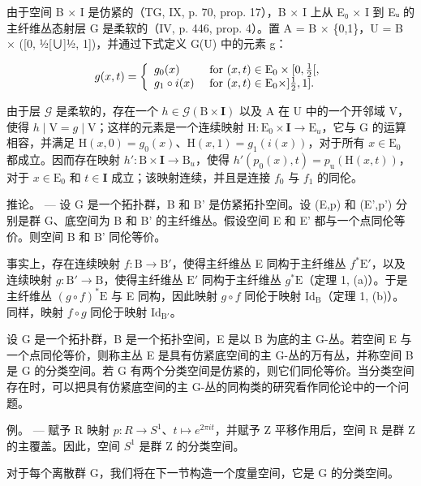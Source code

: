 由于空间 B × I 是仿紧的（TG, IX, p. 70, prop. 17），B × I 上从 E₀ × I 到 Eᵤ 的主纤维丛态射层 G 是柔软的（IV, p. 446, prop. 4）。置 A = B × \{0,1\}，U = B × ([0, ½[∪]½, 1])，并通过下式定义 G(U) 中的元素 g：

\[
g (x, t) = \left\{ \begin{array}{l l} g _ {0} (x) & \text { for } (x, t) \in \mathrm{E} _ {0} \times [ 0, \frac {1}{2} [, \\ g _ {1} \circ i (x) & \text { for } (x, t) \in \mathrm{E} _ {0} \times ] \frac {1}{2}, 1 ]. \end{array} \right.
\]

由于层 \(\mathcal{G}\) 是柔软的，存在一个 \(h \in \mathcal{G}(\mathrm{B} \times \mathbf{I})\) 以及 A 在 U 中的一个开邻域 V，使得 \(h \mid \mathrm{V} = g \mid \mathrm{V}\)；这样的元素是一个连续映射 \(\mathrm{H} \colon \mathrm{E}_0 \times \mathbf{I} \to \mathrm{E}_{u}\)，它与 G 的运算相容，并满足 \(\mathrm{H}(x,0) = g_0(x)\)、\(\mathrm{H}(x,1) = g_1(i(x))\)，对于所有 \(x \in \mathrm{E}_0\) 都成立。因而存在映射 \(h' \colon \mathrm{B} \times \mathbf{I} \to \mathrm{B}_{u}\)，使得 \(h'(p_0(x),t) = p_{\mathrm{u}}(\mathrm{H}(x,t))\)，对于 \(x \in \mathrm{E}_0\) 和 \(t \in \mathbf{I}\) 成立；该映射连续，并且是连接 \(f_0\) 与 \(f_1\) 的同伦。

推论。 --- 设 G 是一个拓扑群，B 和 B' 是仿紧拓扑空间。设 (E,p) 和 (E',p') 分别是群 G、底空间为 B 和 B' 的主纤维丛。假设空间 E 和 E' 都与一个点同伦等价。则空间 B 和 B' 同伦等价。

事实上，存在连续映射 \(f \colon \mathrm{B} \to \mathrm{B}'\)，使得主纤维丛 E 同构于主纤维丛 \(f^* \mathrm{E}'\)，以及连续映射 \(g \colon \mathrm{B}' \to \mathrm{B}\)，使得主纤维丛 \(\mathrm{E}'\) 同构于主纤维丛 \(g^* \mathrm{E}\)（定理 1, (a)）。于是主纤维丛 \((g \circ f)^* \mathrm{E}\) 与 E 同构，因此映射 \(g \circ f\) 同伦于映射 \(\mathrm{Id}_{\mathrm{B}}\)（定理 1, (b)）。同样，映射 \(f \circ g\) 同伦于映射 \(\mathrm{Id}_{\mathrm{B}'}\)。

设 G 是一个拓扑群，B 是一个拓扑空间，E 是以 B 为底的主 G-丛。若空间 E 与一个点同伦等价，则称主丛 E 是具有仿紧底空间的主 G-丛的万有丛，并称空间 B 是 G 的分类空间。若 G 有两个分类空间是仿紧的，则它们同伦等价。当分类空间存在时，可以把具有仿紧底空间的主 G-丛的同构类的研究看作同伦论中的一个问题。

例。 --- 赋予 R 映射 \(p: R \to S^{1}\)、\(t \mapsto e^{2\pi it}\)，并赋予 Z 平移作用后，空间 R 是群 Z 的主覆盖。因此，空间 \(S^{1}\) 是群 Z 的分类空间。

对于每个离散群 G，我们将在下一节构造一个度量空间，它是 G 的分类空间。

